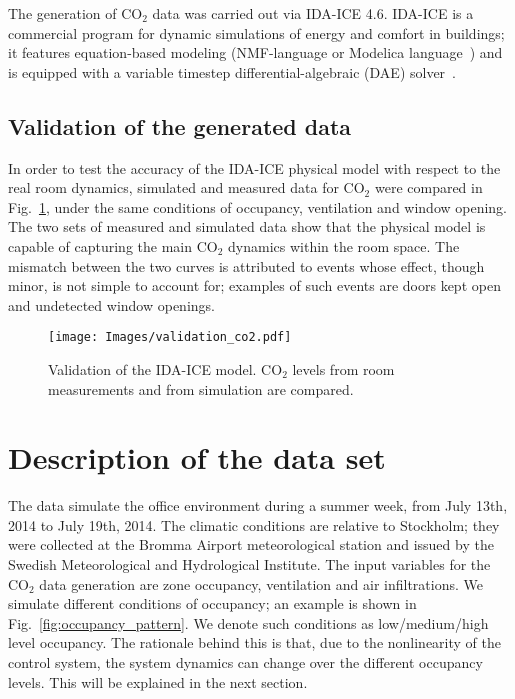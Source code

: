\documentclass{article}
\begin{document}
The generation of CO$_2$ data was carried out via IDA-ICE 4.6. IDA-ICE is a
commercial program for dynamic simulations of energy and comfort in
buildings; it features equation-based modeling (NMF-language or Modelica
language~\cite{fritzson2010principles}) and is equipped with a variable timestep
differential-algebraic (DAE) solver~\cite{sahlin2004whole}.

\subsection{Validation of the generated data}

In order to test the accuracy of the IDA-ICE physical model with respect to the
real room dynamics, simulated and measured data for CO$_2$ were compared in
Fig.~\ref{fig:Physical_model_validation}, under the same conditions of
occupancy, ventilation and window opening. The two sets of measured and
simulated data show that the physical model is capable of capturing the main
CO$_2$ dynamics within the room space. The mismatch between the two curves is
attributed to events whose effect, though minor, is not simple to account for;
examples of such events are doors kept open and undetected window openings.

\begin{figure}[htb]
\centering
\texttt{[image: Images/validation\_co2.pdf]}
\caption{Validation of the IDA-ICE model. CO$_2$ levels from room measurements
and from simulation are compared.}
\label{fig:Physical_model_validation}
\end{figure}

\section{Description of the data set}\label{sec:dataset}
The data simulate the office environment during a summer week, from July 13th,
2014 to July 19th, 2014. The climatic conditions are relative to Stockholm;
they were collected at the Bromma Airport meteorological station and issued by
the Swedish Meteorological and Hydrological Institute. The input variables for
the CO$_2$ data generation are zone occupancy, ventilation and air
infiltrations. We simulate different conditions of occupancy; an example is
shown in
Fig.~\ref{fig:occupancy_pattern}. We denote such conditions as low/medium/high
level occupancy. The rationale behind this is that, due to the nonlinearity of
the control system, the system dynamics can change over the different
occupancy levels. This will be explained in the next section.
\end{document}
